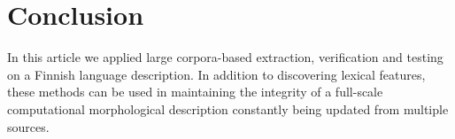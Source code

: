 \documentclass[a5paper]{article}
\begin{document}
\section{Conclusion}

In this article we applied large corpora-based extraction, verification and
testing on a Finnish language description.
In addition to discovering lexical features,
these methods can be used in maintaining the integrity of
a full-scale computational morphological description
constantly being updated from multiple sources.



\end{document}
